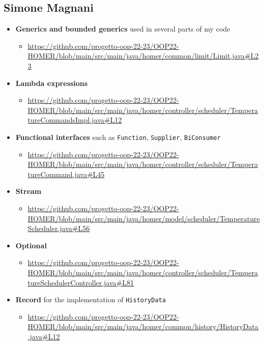 \subsection{Simone Magnani}

\begin{itemize}
    \item \textbf{Generics and bounded generics} used in several parts of my code
    \begin{itemize}
        \item \url{https://github.com/progetto-oop-22-23/OOP22-HOMER/blob/main/src/main/java/homer/common/limit/Limit.java#L23}
    \end{itemize}
    \item \textbf{Lambda expressions}
    \begin{itemize}
        \item \url{https://github.com/progetto-oop-22-23/OOP22-HOMER/blob/main/src/main/java/homer/controller/scheduler/TemperatureCommandsImpl.java#L12}
    \end{itemize}
    \item \textbf{Functional interfaces} such as \texttt{Function}, \texttt{Supplier}, \texttt{BiConsumer}
    \begin{itemize}
        \item \url{https://github.com/progetto-oop-22-23/OOP22-HOMER/blob/main/src/main/java/homer/controller/scheduler/TemperatureCommand.java#L45}
    \end{itemize}
    \item \textbf{Stream}
    \begin{itemize}
        \item \url{https://github.com/progetto-oop-22-23/OOP22-HOMER/blob/main/src/main/java/homer/model/scheduler/TemperatureScheduler.java#L56}
    \end{itemize}
    \item \textbf{Optional}
    \begin{itemize}
        \item \url{https://github.com/progetto-oop-22-23/OOP22-HOMER/blob/main/src/main/java/homer/controller/scheduler/TemperatureSchedulerController.java#L81}
    \end{itemize}
    \item \textbf{Record} for the implementation of \texttt{HistoryData}
    \begin{itemize}
        \item \url{https://github.com/progetto-oop-22-23/OOP22-HOMER/blob/main/src/main/java/homer/common/history/HistoryData.java#L12}

\end{itemize}
\end{itemize}
